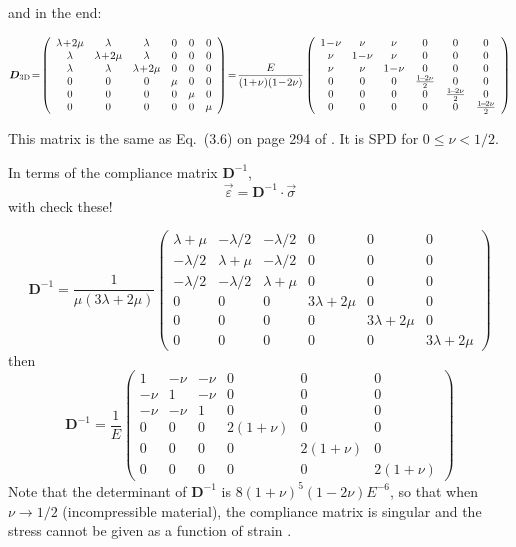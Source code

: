 and in the end:
\begin{mdframed}[backgroundcolor=blue!5]
\begin{equation}
{\bm D}_{\rm 3D} \!= \!
\left(
\begin{array}{cccccc}
\lambda\!+\!2\mu & \lambda & \lambda & 0 & 0 & 0 \\ 
\lambda & \lambda\!+\!2\mu & \lambda & 0 & 0 & 0 \\ 
\lambda & \lambda & \lambda\!+\!2\mu & 0 & 0 & 0 \\
0 & 0 & 0 & \mu & 0 & 0 \\ 
0 & 0 & 0 & 0 & \mu & 0 \\ 
0 & 0 & 0 & 0 & 0 & \mu  
\end{array}
\right)
\!=\!
\frac{E}{(1\!+\!\nu)(1\!-\!2\nu)}
\left(
\begin{array}{cccccc}
1\!-\!\nu & \nu & \nu & 0 & 0 & 0 \\ 
\nu & 1\!-\!\nu & \nu& 0 & 0 & 0 \\ 
\nu & \nu & 1\!-\!\nu & 0 & 0 & 0 \\
0 & 0 & 0 & \frac{1\!-\!2\nu}{2} & 0 & 0 \\ 
0 & 0 & 0 & 0 & \frac{1\!-\!2\nu}{2} & 0 \\ 
0 & 0 & 0 & 0 & 0 & \frac{1\!-\!2\nu}{2}
\end{array}
\right)
\label{eq:D_3D}
\end{equation}
\end{mdframed}
This matrix is the same as Eq.~(3.6) on page 294 of \textcite{braess}.
It is SPD for $0\leq \nu < 1/2$.

In terms of the compliance matrix ${\bm D}^{-1}$,
\[
\vec{\varepsilon} 
= {\bm D}^{-1} \cdot \vec{\sigma}
\]
with
{\color{red} check these!}

\[
{\bm D}^{-1}
=
\frac{1}{\mu(3\lambda+2\mu)}
\left(
\begin{array}{cccccc}
\lambda+\mu & -\lambda/2 & -\lambda/2 & 0 & 0 & 0 \\
-\lambda/2 & \lambda+\mu & -\lambda/2 & 0 & 0 & 0 \\
-\lambda/2 & -\lambda/2 & \lambda+\mu & 0 & 0 & 0 \\
0 & 0 & 0 & 3\lambda+2\mu & 0 & 0 \\ 
0 & 0 & 0 & 0 & 3\lambda+2\mu & 0 \\ 
0 & 0 & 0 & 0 & 0 & 3\lambda+2\mu  
\end{array}
\right)
\]
then
\[
{\bm D}^{-1}
=
\frac{1}{E}
\left(
\begin{array}{cccccc}
1 & -\nu & -\nu & 0 & 0 & 0 \\
-\nu & 1 & -\nu & 0 & 0 & 0 \\
-\nu & -\nu & 1 & 0 & 0 & 0 \\
0 & 0 & 0 & 2(1+\nu) & 0 & 0 \\ 
0 & 0 & 0 & 0 & 2(1+\nu) & 0 \\ 
0 & 0 & 0 & 0 & 0 & 2(1+\nu) 
\end{array}
\right)
\]
Note that the determinant  of ${\bm D}^{-1}$ is $8(1+\nu)^5(1-2\nu)E^{-6}$, so that when $\nu\rightarrow 1/2$ (incompressible material), the compliance matrix is singular and the stress cannot be given as a function of strain \cite{lubliner}.


